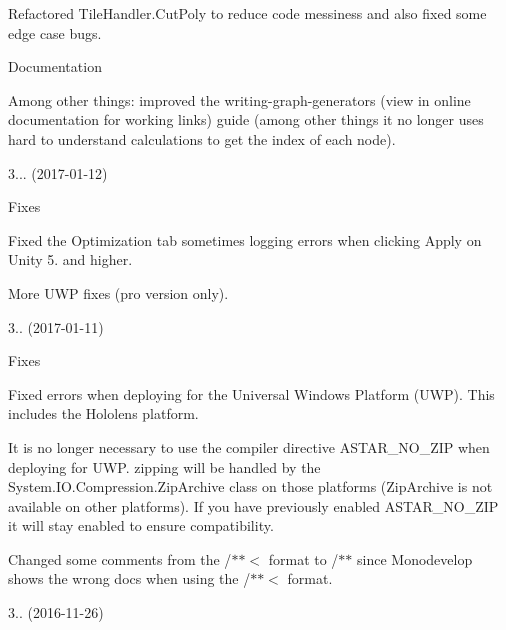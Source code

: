 \begin{DoxyItemize}
\begin{DoxyItemize}
\begin{DoxyItemize}
\item Refactored Tile\+Handler.\+Cut\+Poly to reduce code messiness and also fixed some edge case bugs.
\end{DoxyItemize}
\item Documentation
\begin{DoxyItemize}
\item Among other things\+: improved the writing-\/graph-\/generators (view in online documentation for working links) guide (among other things it no longer uses hard to understand calculations to get the index of each node).
\end{DoxyItemize}
\end{DoxyItemize}
\item 3... (2017-\/01-\/12)
\begin{DoxyItemize}
\item Fixes
\begin{DoxyItemize}
\item Fixed the \textquotesingle{}Optimization\textquotesingle{} tab sometimes logging errors when clicking Apply on Unity 5. and higher.
\item More U\+WP fixes (pro version only).
\end{DoxyItemize}
\end{DoxyItemize}
\item 3.. (2017-\/01-\/11)
\begin{DoxyItemize}
\item Fixes
\begin{DoxyItemize}
\item Fixed errors when deploying for the Universal Windows Platform (U\+WP). This includes the Hololens platform.
\item It is no longer necessary to use the compiler directive A\+S\+T\+A\+R\+\_\+\+N\+O\+\_\+\+Z\+IP when deploying for U\+WP. zipping will be handled by the System.\+I\+O.\+Compression.\+Zip\+Archive class on those platforms (Zip\+Archive is not available on other platforms). If you have previously enabled A\+S\+T\+A\+R\+\_\+\+N\+O\+\_\+\+Z\+IP it will stay enabled to ensure compatibility.
\item Changed some comments from the \textquotesingle{}/$\ast$$\ast$$<$\textquotesingle{} format to \textquotesingle{}/$\ast$$\ast$\textquotesingle{} since Monodevelop shows the wrong docs when using the \textquotesingle{}/$\ast$$\ast$$<$\textquotesingle{} format.
\end{DoxyItemize}
\end{DoxyItemize}
\item 3.. (2016-\/11-\/26)

\end{DoxyItemize}
